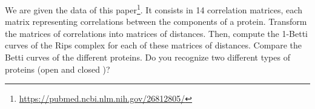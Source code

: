 \noindent\linia

\begin{exercise}
    We are given the data of this
    paper\footnote{\url{https://pubmed.ncbi.nlm.nih.gov/26812805/}}. It
    consists in 14 correlation matrices, each matrix representing correlations
    between the components of a protein. Transform the matrices of
    correlations into matrices of distances. Then, compute the 1-Betti curves
    of the Rips complex for each of these matrices of distances. Compare the
    Betti curves of the different proteins. Do you recognize two different
    types of proteins (open and closed )?
\end{exercise}